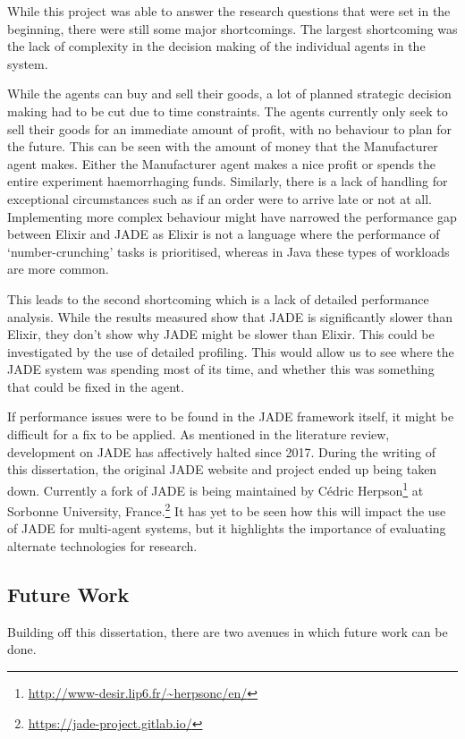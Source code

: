 While this project was able to answer the research questions that were set in the beginning, there were still some major shortcomings.
The largest shortcoming was the lack of complexity in the decision making of the individual agents in the system.

While the agents can buy and sell their goods, a lot of planned strategic decision making had to be cut due to time constraints.
The agents currently only seek to sell their goods for an immediate amount of profit, with no behaviour to plan for the future.
This can be seen with the amount of money that the Manufacturer agent makes.
Either the Manufacturer agent makes a nice profit or spends the entire experiment haemorrhaging funds.
Similarly, there is a lack of handling for exceptional circumstances such as if an order were to arrive late or not at all.
Implementing more complex behaviour might have narrowed the performance gap between Elixir and JADE as Elixir is not a language where the performance of `number-crunching' tasks is prioritised, whereas in Java these types of workloads are more common.

This leads to the second shortcoming which is a lack of detailed performance analysis.
While the results measured show that JADE is significantly slower than Elixir, they don't show why JADE might be slower than Elixir.
This could be investigated by the use of detailed profiling.
This would allow us to see where the JADE system was spending most of its time, and whether this was something that could be fixed in the agent.

If performance issues were to be found in the JADE framework itself, it might be difficult for a fix to be applied.
As mentioned in the literature review, development on JADE has affectively halted since 2017.
During the writing of this dissertation, the original JADE website and project ended up being taken down.
Currently a fork of JADE is being maintained by C\'edric Herpson\footnote{\url{http://www-desir.lip6.fr/~herpsonc/en/}} at Sorbonne University, France.\footnote{\url{https://jade-project.gitlab.io/}}
It has yet to be seen how this will impact the use of JADE for multi-agent systems, but it highlights the importance of evaluating alternate technologies for research.

\subsection{Future Work}

Building off this dissertation, there are two avenues in which future work can be done.

